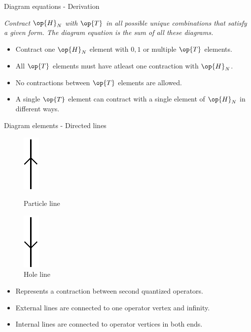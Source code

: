 \begin{frame}{Diagram equations - Derivation}

    \emph{Contract $\op{H}_N$ with $\op{T}$ in all possible unique combinations that satisfy a given form. The diagram equation is the sum of all these diagrams.}

    \pause
    \begin{itemize}
        \item Contract one $\op{H}_N$ element with $0,1$ or multiple $\op{T}$ elements. \pause
        \item All $\op{T}$ elements must have \alert{atleast} one contraction with $\op{H}_N$. \pause
        \item No contractions between $\op{T}$ elements are allowed. \pause
        \item A single $\op{T}$ element can contract with a single element of $\op{H}_N$ in different ways.
    \end{itemize}
\end{frame}

\begin{frame}{Diagram elements - Directed lines}

    \begin{figure}
    \centering
        \parbox{0.35\textwidth}{
            \centering
            \includegraphics[scale=0.75]{graphics/particleline}
            \caption{Particle line}
        } \qquad
        \parbox{0.35\textwidth}{
            \centering
            \includegraphics[scale=0.75]{graphics/holeline}
            \caption{Hole line}
        }
    \end{figure}

    \begin{itemize}
        \item Represents a contraction between second quantized operators.
        \item External lines are connected to one operator vertex and infinity.
        \item Internal lines are connected to operator vertices in both ends.
    \end{itemize}

\end{frame}


